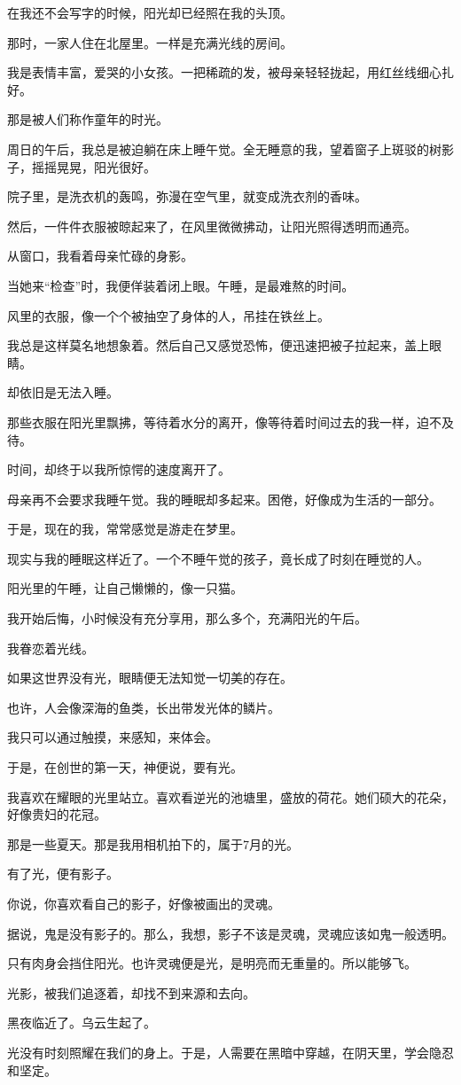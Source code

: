 \documentclass[12pt,a4paper]{article}
\begin{document}
		在我还不会写字的时候，阳光却已经照在我的头顶。\par
		那时，一家人住在北屋里。一样是充满光线的房间。\par
		我是表情丰富，爱哭的小女孩。一把稀疏的发，被母亲轻轻拢起，用红丝线细心扎好。\par
		那是被人们称作童年的时光。\par
		周日的午后，我总是被迫躺在床上睡午觉。全无睡意的我，望着窗子上斑驳的树影子，摇摇晃晃，阳光很好。\par
		院子里，是洗衣机的轰鸣，弥漫在空气里，就变成洗衣剂的香味。\par
		然后，一件件衣服被晾起来了，在风里微微拂动，让阳光照得透明而通亮。\par
		从窗口，我看着母亲忙碌的身影。\par
		当她来“检查”时，我便佯装着闭上眼。午睡，是最难熬的时间。\par
		风里的衣服，像一个个被抽空了身体的人，吊挂在铁丝上。\par
		我总是这样莫名地想象着。然后自己又感觉恐怖，便迅速把被子拉起来，盖上眼睛。\par
		却依旧是无法入睡。\par
		那些衣服在阳光里飘拂，等待着水分的离开，像等待着时间过去的我一样，迫不及待。\par
		时间，却终于以我所惊愕的速度离开了。\par
		母亲再不会要求我睡午觉。我的睡眠却多起来。困倦，好像成为生活的一部分。\par
		于是，现在的我，常常感觉是游走在梦里。\par
		现实与我的睡眠这样近了。一个不睡午觉的孩子，竟长成了时刻在睡觉的人。

		阳光里的午睡，让自己懒懒的，像一只猫。\par
		我开始后悔，小时候没有充分享用，那么多个，充满阳光的午后。

		我眷恋着光线。\par
		如果这世界没有光，眼睛便无法知觉一切美的存在。\par
		也许，人会像深海的鱼类，长出带发光体的鳞片。\par
		我只可以通过触摸，来感知，来体会。\par
		于是，在创世的第一天，神便说，要有光。\par
		我喜欢在耀眼的光里站立。喜欢看逆光的池塘里，盛放的荷花。她们硕大的花朵，好像贵妇的花冠。\par
		那是一些夏天。那是我用相机拍下的，属于7月的光。\par
		有了光，便有影子。\par
		你说，你喜欢看自己的影子，好像被画出的灵魂。\par
		据说，鬼是没有影子的。那么，我想，影子不该是灵魂，灵魂应该如鬼一般透明。\par
		只有肉身会挡住阳光。也许灵魂便是光，是明亮而无重量的。所以能够飞。\par
		光影，被我们追逐着，却找不到来源和去向。\par
		黑夜临近了。乌云生起了。\par
		光没有时刻照耀在我们的身上。于是，人需要在黑暗中穿越，在阴天里，学会隐忍和坚定。
\end{document}
